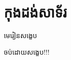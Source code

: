 \chapter{កុងដង់សាទ័រ}
\begin{center}
	{\Large \kml\color{magenta}មេរៀនសង្ខេប}
\end{center}

\begin{center}
	{\Large \kml\color{magenta} ចប់ដោយសង្ខេប!!!}
\end{center}